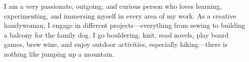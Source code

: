 

I am a very passionate, outgoing, and curious person who loves learning, experimenting, and immersing myself in every 
area of my work. As a creative handywoman, I engage in different projects---everything from sewing to building a balcony 
for the family dog. I go bouldering, knit, read novels, play board games, brew wine, and enjoy outdoor activities, 
especially hiking---there is nothing like jumping up a mountain.
